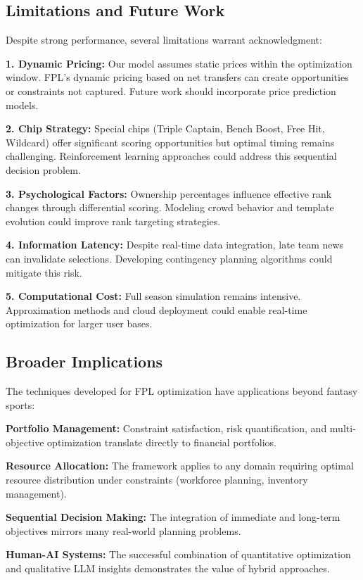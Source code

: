 \documentclass[10pt,a4paper,twocolumn]{article}
\begin{document}
\subsection*{Limitations and Future Work}

Despite strong performance, several limitations warrant acknowledgment:

\textbf{1. Dynamic Pricing:} Our model assumes static prices within the optimization window. FPL's dynamic pricing based on net transfers can create opportunities or constraints not captured. Future work should incorporate price prediction models.

\textbf{2. Chip Strategy:} Special chips (Triple Captain, Bench Boost, Free Hit, Wildcard) offer significant scoring opportunities but optimal timing remains challenging. Reinforcement learning approaches could address this sequential decision problem.

\textbf{3. Psychological Factors:} Ownership percentages influence effective rank changes through differential scoring. Modeling crowd behavior and template evolution could improve rank targeting strategies.

\textbf{4. Information Latency:} Despite real-time data integration, late team news can invalidate selections. Developing contingency planning algorithms could mitigate this risk.

\textbf{5. Computational Cost:} Full season simulation remains intensive. Approximation methods and cloud deployment could enable real-time optimization for larger user bases.

\subsection*{Broader Implications}

The techniques developed for FPL optimization have applications beyond fantasy sports:

\textbf{Portfolio Management:} Constraint satisfaction, risk quantification, and multi-objective optimization translate directly to financial portfolios.

\textbf{Resource Allocation:} The framework applies to any domain requiring optimal resource distribution under constraints (workforce planning, inventory management).

\textbf{Sequential Decision Making:} The integration of immediate and long-term objectives mirrors many real-world planning problems.

\textbf{Human-AI Systems:} The successful combination of quantitative optimization and qualitative LLM insights demonstrates the value of hybrid approaches.
\end{document}
